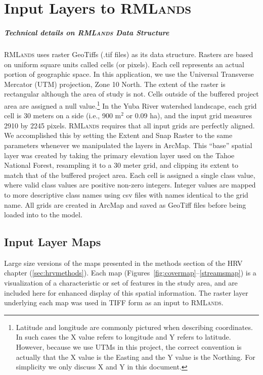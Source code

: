 \appendix


\chapter{Input Layers to \textsc{RMLands}}
\label{app:inputs}

\paragraph{Technical details on \textsc{RMLands} Data Structure}
\label{app:rmlspecs}
\textsc{RMLands} uses raster GeoTiffs (.tif files) as its data structure. Rasters are based on uniform square units called cells (or pixels). Each cell represents an actual portion of geographic space. In this application, we use the Universal Transverse Mercator (UTM) projection, Zone 10 North. The extent of the raster is rectangular although the area of study is not. Cells outside of the buffered project area are assigned a null value.\footnote{Latitude and longitude are commonly pictured when describing coordinates. In such cases the X value refers to longitude and Y refers to latitude. However, because we use UTMs in this project, the correct convention is actually that the X value is the Easting and the Y value is the Northing. For simplicity we only discuss X and Y  in this document.} In the Yuba River watershed landscape, each grid cell is 30 meters on a side (i.e., 900 m$^2$ or 0.09 ha), and the input grid measures 2910 by 2245 pixels. \textsc{RMLands} requires that all input grids are perfectly aligned. We accomplished this by setting the Extent and Snap Raster to the same parameters whenever we manipulated the layers in ArcMap. This ``base'' spatial layer was created by taking the primary elevation layer used on the Tahoe National Forest, resampling it to a 30 meter grid, and clipping its extent to match that of the buffered project area. Each cell is assigned a single class value, where valid class values are positive non-zero integers. Integer values are mapped to more descriptive class names using csv files with names identical to the grid name. All grids are created in ArcMap and saved as GeoTiff files before being loaded into to the model. 

\section{Input Layer Maps}
\label{app:sec:inputmaps}

Large size versions of the maps presented in the methods section of the HRV chapter (\ref{sec:hrvmethods}). Each map (Figures~\ref{fig:covermap}--\ref{streamsmap}) is a visualization of a characteristic or set of features in the study area, and are included here for enhanced display of this spatial information. The raster layer underlying each map was used in TIFF form as an input to \textsc{RMLands}.

